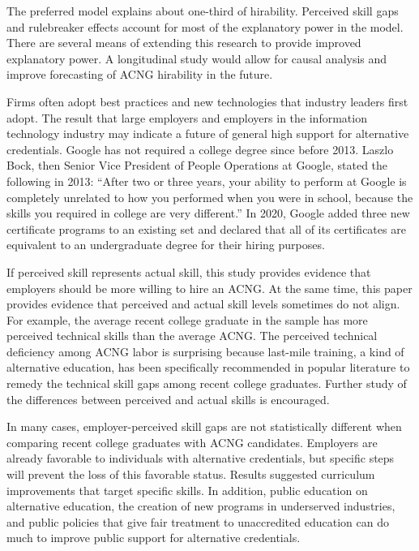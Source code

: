 The preferred model explains about one-third of hirability.
Perceived skill gaps and rulebreaker effects account for most of the explanatory power in the model.
There are several means of extending this research to provide improved explanatory power.
A longitudinal study would allow for causal analysis and improve forecasting of ACNG hirability in the future.

Firms often adopt best practices and new technologies that industry leaders first adopt.
The result that large employers and employers in the information technology industry
may indicate a future of general high support for alternative credentials.
Google has not required a college degree since before 2013\cite{bryant2013head}.
Laszlo Bock, then Senior Vice President of People Operations at Google, stated the following in 2013:
``After two or three years, your ability to perform at Google is completely unrelated to how you performed when you were in school, because the skills you required in college are very different.''
In 2020, Google added three new certificate programs to an existing set and declared that all of its certificates are equivalent to an undergraduate degree for their hiring purposes\cite{hess_2020}.

If perceived skill represents actual skill, this study provides evidence that employers should be more willing to hire an ACNG.
At the same time, this paper provides evidence that perceived and actual skill levels sometimes do not align.
For example, the average recent college graduate in the sample has more perceived technical skills than the average ACNG.
The perceived technical deficiency among ACNG labor is surprising because last-mile training, a kind of alternative education, has been specifically recommended in popular literature to remedy the technical skill gaps among recent college graduates.
Further study of the differences between perceived and actual skills is encouraged.

In many cases, employer-perceived skill gaps are not statistically different when comparing recent college graduates with ACNG candidates.
Employers are already favorable to individuals with alternative credentials,
but specific steps will prevent the loss of this favorable status.
Results suggested curriculum improvements that target specific skills.
In addition, public education on alternative education,
the creation of new programs in underserved industries,
and public policies that give fair treatment to unaccredited education
can do much to improve public support for alternative credentials.
